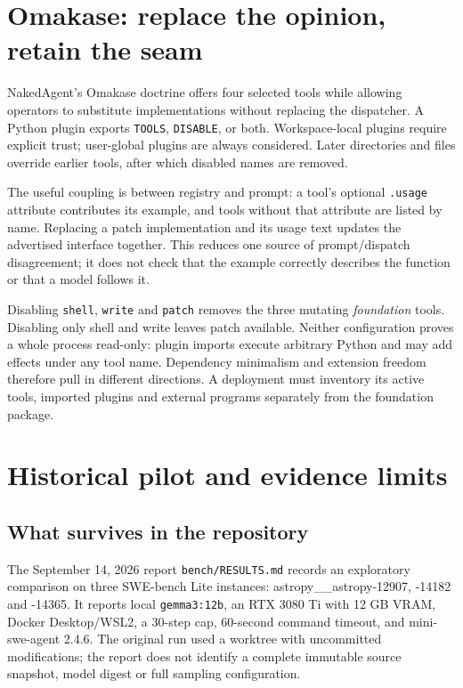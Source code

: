 \documentclass[10pt,twocolumn,letterpaper]{article}
\begin{document}
\section{Omakase: replace the opinion, retain the seam}
NakedAgent's Omakase doctrine offers four selected tools while allowing operators to substitute implementations without replacing the dispatcher. A Python plugin exports \texttt{TOOLS}, \texttt{DISABLE}, or both. Workspace-local plugins require explicit trust; user-global plugins are always considered. Later directories and files override earlier tools, after which disabled names are removed.

The useful coupling is between registry and prompt: a tool's optional \texttt{.usage} attribute contributes its example, and tools without that attribute are listed by name. Replacing a patch implementation and its usage text updates the advertised interface together. This reduces one source of prompt/dispatch disagreement; it does not check that the example correctly describes the function or that a model follows it.

Disabling \texttt{shell}, \texttt{write} and \texttt{patch} removes the three mutating \emph{foundation} tools. Disabling only shell and write leaves patch available. Neither configuration proves a whole process read-only: plugin imports execute arbitrary Python and may add effects under any tool name. Dependency minimalism and extension freedom therefore pull in different directions. A deployment must inventory its active tools, imported plugins and external programs separately from the foundation package.

\section{Historical pilot and evidence limits}
\subsection{What survives in the repository}
The September 14, 2026 report \texttt{bench/RESULTS.md} records an exploratory comparison on three SWE-bench Lite instances: astropy\_\_astropy-12907, -14182 and -14365. It reports local \texttt{gemma3:12b}, an RTX 3080 Ti with 12 GB VRAM, Docker Desktop/WSL2, a 30-step cap, 60-second command timeout, and mini-swe-agent 2.4.6. The original run used a worktree with uncommitted modifications; the report does not identify a complete immutable source snapshot, model digest or full sampling configuration.
\end{document}
